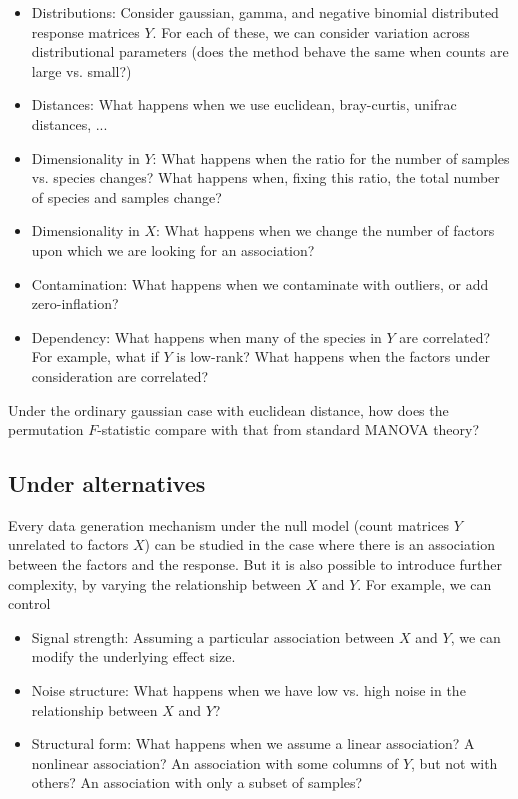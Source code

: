 \documentclass{article}
\begin{document}
\begin{itemize}
  \item Distributions: Consider gaussian, gamma, and negative binomial
    distributed response matrices $Y$. For each of these, we can consider
    variation across distributional parameters (does the method behave the same
    when counts are large vs. small?)
  \item Distances: What happens when we use euclidean, bray-curtis, unifrac distances, ...
  \item Dimensionality in $Y$: What happens when the ratio for the number of
    samples vs. species changes? What happens when, fixing this ratio, the total
    number of species and samples change?
  \item Dimensionality in $X$: What happens when we change the number of factors
    upon which we are looking for an association?
  \item Contamination: What happens when we contaminate with outliers, or add
    zero-inflation?
  \item Dependency: What happens when many of the species in $Y$ are correlated?
    For example, what if $Y$ is low-rank? What happens when the factors under
    consideration are correlated?
\end{itemize}

Under the ordinary gaussian case with euclidean distance, how does the
permutation $F$-statistic compare with that from standard MANOVA theory?

\subsection{Under alternatives}

Every data generation mechanism under the null model (count matrices $Y$
unrelated to factors $X$) can be studied in the case where there is an
association between the factors and the response. But it is also possible to
introduce further complexity, by varying the relationship between $X$ and $Y$.
For example, we can control
\begin{itemize}
\item Signal strength: Assuming a particular association between $X$ and $Y$, we
  can modify the underlying effect size.
\item Noise structure: What happens when we have low vs. high noise in the
  relationship between $X$ and $Y$?
\item Structural form: What happens when we assume a linear association? A
  nonlinear association? An association with some columns of $Y$, but not with
  others? An association with only a subset of samples?
\end{itemize}



\end{document}
